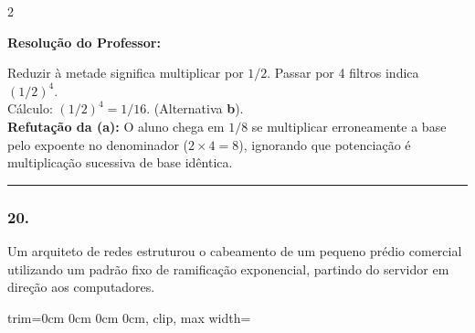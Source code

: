 \begin{multicols*}{2}
\ifgabarito
    \begin{tcolorbox}[colback=CorTitUm!5, colframe=CorTitUm, boxrule=1pt, arc=4pt, left=6pt, right=6pt, top=6pt, bottom=6pt]
    \small\textbf{\textcolor{CorTitUm}{Resolução do Professor:}}\par\vspace{0.1cm}
    \color{CinzaEscuro}
    Reduzir à metade significa multiplicar por $ 1/2 $. Passar por 4 filtros indica $ (1/2)^{4} $.\\
    Cálculo: $ (1/2)^{4} = 1 / 16 $. (Alternativa \textbf{b}).\\
    \textbf{Refutação da (a):} O aluno chega em $ 1/8 $ se multiplicar erroneamente a base pelo expoente no denominador ($ 2 \times 4 = 8 $), ignorando que potenciação é multiplicação sucessiva de base idêntica.
    \end{tcolorbox}
\fi

\par\vspace{\espacoQuestao}

\noindent\textcolor{CorLinha}{\rule{\linewidth}{0.5pt}} 
\par\vspace{\espacoPreQuestao}
\subsubsection*{20.} Um arquiteto de redes estruturou o cabeamento de um pequeno prédio comercial utilizando um padrão fixo de ramificação exponencial, partindo do servidor em direção aos computadores.
\begin{center}
\begin{adjustbox}{trim=0cm 0cm 0cm 0cm, clip, max width=\larguraTikz}
\end{adjustbox}
\end{center}
\end{multicols*}
